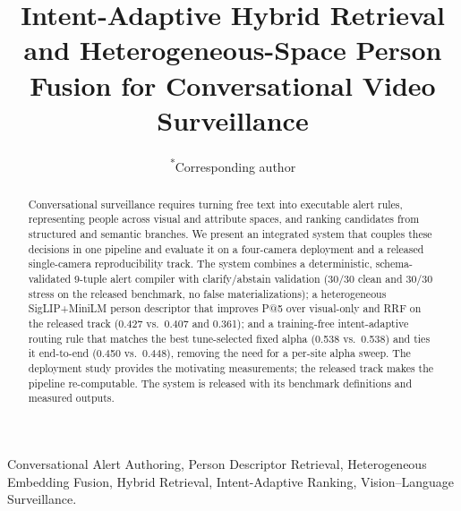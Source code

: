 ﻿\documentclass[conference]{IEEEtran}
\theoremstyle{plain}
\begin{document}
\title{Intent-Adaptive Hybrid Retrieval and Heterogeneous-Space Person Fusion for Conversational Video Surveillance}

\author{
\textsuperscript{*}Corresponding author
}

\maketitle
\thispagestyle{firstpage}

\begin{abstract}
\sloppy
Conversational surveillance requires turning free text into executable alert rules, representing people across visual and attribute spaces, and ranking candidates from structured and semantic branches. We present an integrated system that couples these decisions in one pipeline and evaluate it on a four-camera deployment and a released single-camera reproducibility track. The system combines a deterministic, schema-validated 9-tuple alert compiler with clarify/abstain validation (30/30 clean and 30/30 stress on the released benchmark, no false materializations); a heterogeneous SigLIP+MiniLM person descriptor that improves P@5 over visual-only and RRF on the released track (0.427 vs.\ 0.407 and 0.361); and a training-free intent-adaptive routing rule that matches the best tune-selected fixed alpha (0.538 vs.\ 0.538) and ties it end-to-end (0.450 vs.\ 0.448), removing the need for a per-site alpha sweep. The deployment study provides the motivating measurements; the released track makes the pipeline re-computable. The system is released with its benchmark definitions and measured outputs.
\fussy
\end{abstract}

\begin{IEEEkeywords}
Conversational Alert Authoring, Person Descriptor Retrieval, Heterogeneous Embedding Fusion, Hybrid Retrieval, Intent-Adaptive Ranking, Vision--Language Surveillance.
\end{IEEEkeywords}
\end{document}
